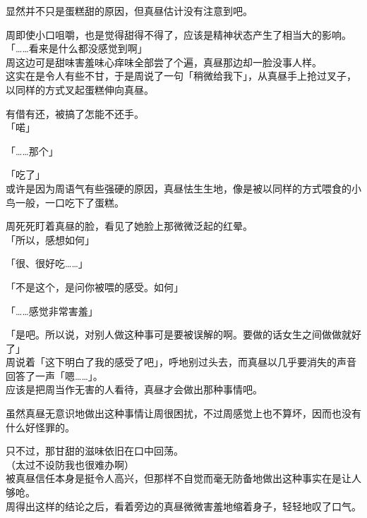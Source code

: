 显然并不只是蛋糕甜的原因，但真昼估计没有注意到吧。

周即使小口咀嚼，也是觉得甜得不得了，应该是精神状态产生了相当大的影响。\\

「……看来是什么都没感觉到啊」\\

周这边可是甜味害羞味心痒味全部尝了个遍，真昼那边却一脸没事人样。\\

这实在是令人有些不甘，于是周说了一句「稍微给我下」，从真昼手上抢过叉子，以同样的方式叉起蛋糕伸向真昼。

有借有还，被搞了怎能不还手。\\

「喏」

「……那个」

「吃了」\\

或许是因为周语气有些强硬的原因，真昼怯生生地，像是被以同样的方式喂食的小鸟一般，一口吃下了蛋糕。

周死死盯着真昼的脸，看见了她脸上那微微泛起的红晕。\\

「所以，感想如何」

「很、很好吃……」

「不是这个，是问你被喂的感受。如何」

「……感觉非常害羞」

「是吧。所以说，对别人做这种事可是要被误解的啊。要做的话女生之间做做就好了」\\

周说着「这下明白了我的感受了吧」，呼地别过头去，而真昼以几乎要消失的声音回答了一声「嗯……」。\\

应该是把周当作无害的人看待，真昼才会做出那种事情吧。

虽然真昼无意识地做出这种事情让周很困扰，不过周感觉上也不算坏，因而也没有什么好怪罪的。

只不过，那甘甜的滋味依旧在口中回荡。\\

（太过不设防我也很难办啊）\\

被真昼信任本身是挺令人高兴，但那样不自觉而毫无防备地做出这种事实在是让人够呛。\\

周得出这样的结论之后，看着旁边的真昼微微害羞地缩着身子，轻轻地叹了口气。
